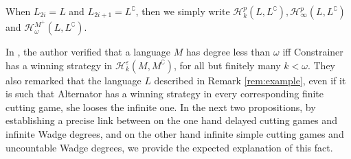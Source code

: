 When $L_{2i}=L$ and $L_{2i +1}=L^\complement$, then we simply write $\mathcal{H}^p_k(L, L^\complement), \mathcal{H}^p_\infty(L, L^\complement)$ and  $\mathcal{H}^{M^+}_\omega(L, L^\complement)$.

In \cite{bp}, the author verified that a language $M$ has degree less than $\omega$ iff  Constrainer has a winning strategy in $\mathcal{H}^\varepsilon_k(M, M^\complement)$, for all but finitely many $k< \omega$.
They also remarked that the language $L$ described in Remark \ref{rem:example}, even  if it is such that Alternator has a winning strategy in every corresponding finite cutting game, she looses the infinite one.
In the next two propositions, by establishing a precise link between on the one hand delayed cutting games and infinite Wadge degrees, and on the other hand infinite simple cutting games and uncountable Wadge degrees, we provide the expected explanation of this fact.


